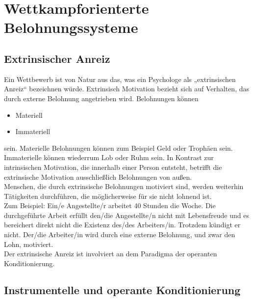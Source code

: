 \chapter{Wettkampforienterte Belohnungssysteme}
\reiter
 
	\section{Extrinsischer Anreiz}
	
Ein Wettbewerb ist von Natur aus das, was ein Psychologe als „extrinsischen Anreiz“ bezeichnen würde.
Extrinsisch Motivation bezieht sich auf Verhalten, das durch externe Belohnung angetrieben wird. Belohnungen können 
  
		\begin{itemize}
			\item Materiell
  		\item Immateriell
		\end{itemize}
		
sein. Materielle Belohnungen können zum Beispiel Geld oder Trophäen sein. Immaterielle können wiederrum Lob oder Ruhm sein. In Kontrast zur intrinsischen Motivation, die innerhalb einer Person entsteht, betrifft die extrinsische Motivation ausschließlich Belohnungen von außen. \\

Menschen, die durch extrinsische Belohnungen motiviert sind, werden weiterhin Tätigkeiten durchführen, die möglicherweise für sie nicht lohnend ist. \\
Zum Beispiel: Ein/e Angestellte/r arbeitet 40 Stunden die Woche. Die durchgeführte Arbeit erfüllt den/die Angestellte/n nicht mit Lebensfreude und es bereichert direkt nicht die Existenz des/des Arbeiters/in. Trotzdem kündigt er nicht. Der/die Arbeiter/in wird durch eine externe Belohnung, und zwar den Lohn, motiviert. \\
Der extrinsische Anreiz ist involviert an dem Paradigma der operanten Konditionierung.


	\section{Instrumentelle und operante Konditionierung}
	
